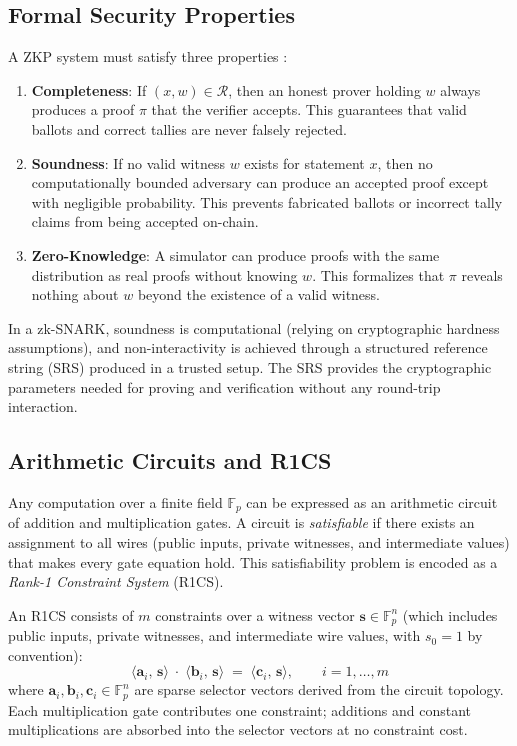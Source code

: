 \subsection{Formal Security Properties}

A ZKP system must satisfy three properties \cite{goldwasser1989}:
\begin{enumerate}
    \item \textbf{Completeness}: If $(x, w) \in \mathcal{R}$, then an honest prover holding $w$ always produces a proof $\pi$ that the verifier accepts. This guarantees that valid ballots and correct tallies are never falsely rejected.
    \item \textbf{Soundness}: If no valid witness $w$ exists for statement $x$, then no computationally bounded adversary can produce an accepted proof except with negligible probability. This prevents fabricated ballots or incorrect tally claims from being accepted on-chain.
    \item \textbf{Zero-Knowledge}: A simulator can produce proofs with the same distribution as real proofs without knowing $w$. This formalizes that $\pi$ reveals nothing about $w$ beyond the existence of a valid witness.
\end{enumerate}

In a zk-SNARK, soundness is computational (relying on cryptographic hardness assumptions), and non-interactivity is achieved through a structured reference string (SRS) produced in a trusted setup. The SRS provides the cryptographic parameters needed for proving and verification without any round-trip interaction.

\subsection{Arithmetic Circuits and R1CS}

Any computation over a finite field $\mathbb{F}_p$ can be expressed as an arithmetic circuit of addition and multiplication gates. A circuit is \emph{satisfiable} if there exists an assignment to all wires (public inputs, private witnesses, and intermediate values) that makes every gate equation hold. This satisfiability problem is encoded as a \emph{Rank-1 Constraint System} (R1CS).

An R1CS consists of $m$ constraints over a witness vector $\mathbf{s} \in \mathbb{F}_p^n$ (which includes public inputs, private witnesses, and intermediate wire values, with $s_0 = 1$ by convention):
\begin{equation}
    \langle \mathbf{a}_i,\, \mathbf{s} \rangle \;\cdot\; \langle \mathbf{b}_i,\, \mathbf{s} \rangle \;=\; \langle \mathbf{c}_i,\, \mathbf{s} \rangle, \qquad i = 1, \dots, m
\end{equation}
where $\mathbf{a}_i, \mathbf{b}_i, \mathbf{c}_i \in \mathbb{F}_p^n$ are sparse selector vectors derived from the circuit topology. Each multiplication gate contributes one constraint; additions and constant multiplications are absorbed into the selector vectors at no constraint cost.

